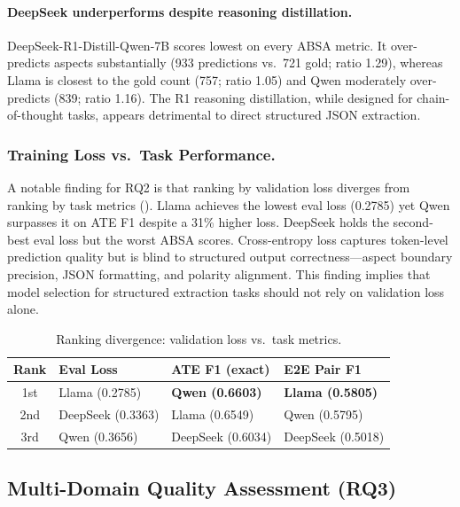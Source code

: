 \documentclass[runningheads]{llncs}
\begin{document}
\paragraph{DeepSeek underperforms despite reasoning distillation.} DeepSeek-R1-Distill-Qwen-7B scores lowest on every ABSA metric. It over-predicts aspects substantially (933 predictions vs.\ 721 gold; ratio 1.29), whereas Llama is closest to the gold count (757; ratio 1.05) and Qwen moderately over-predicts (839; ratio 1.16). The R1 reasoning distillation, while designed for chain-of-thought tasks, appears detrimental to direct structured JSON extraction.

\subsubsection{Training Loss vs.\ Task Performance.}
\label{sec:res_loss_vs_task}

A notable finding for RQ2 is that ranking by validation loss diverges from ranking by task metrics (). Llama achieves the lowest eval loss (0.2785) yet Qwen surpasses it on ATE F1 despite a 31\% higher loss. DeepSeek holds the second-best eval loss but the worst ABSA scores. Cross-entropy loss captures token-level prediction quality but is blind to structured output correctness---aspect boundary precision, JSON formatting, and polarity alignment. This finding implies that model selection for structured extraction tasks should not rely on validation loss alone.

\begin{table}[t]
\centering
\caption{Ranking divergence: validation loss vs.\ task metrics.}
\label{tab:loss_vs_task}
\setlength{\tabcolsep}{4pt}
\begin{tabular}{clll}
\toprule
\textbf{Rank} & \textbf{Eval Loss} & \textbf{ATE F1 (exact)} & \textbf{E2E Pair F1} \\
\midrule
1st & Llama (0.2785) & \textbf{Qwen (0.6603)}    & \textbf{Llama (0.5805)} \\
2nd & DeepSeek (0.3363) & Llama (0.6549)          & Qwen (0.5795) \\
3rd & Qwen (0.3656)     & DeepSeek (0.6034)       & DeepSeek (0.5018) \\
\bottomrule
\end{tabular}
\end{table}

\subsection{Multi-Domain Quality Assessment (RQ3)}
\label{sec:res_multidomain}
\end{document}
